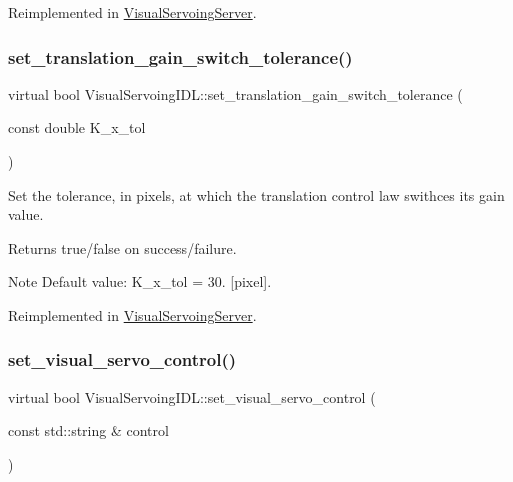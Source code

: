 Reimplemented in \hyperlink{classVisualServoingServer_a66324b38d90efb1e68cdfff9fd969487}{Visual\+Servoing\+Server}.

\mbox{\label{classVisualServoingIDL_ad7800969fdb9a88cce5e59552fca8b1f}} 
\subsubsection{\texorpdfstring{set\+\_\+translation\+\_\+gain\+\_\+switch\+\_\+tolerance()}{set\_translation\_gain\_switch\_tolerance()}}
{\footnotesize\ttfamily virtual bool Visual\+Servoing\+I\+D\+L\+::set\+\_\+translation\+\_\+gain\+\_\+switch\+\_\+tolerance (\begin{DoxyParamCaption}\item[{const double}]{K\+\_\+x\+\_\+tol }\end{DoxyParamCaption})\hspace{0.3cm}{\ttfamily [virtual]}}



Set the tolerance, in pixels, at which the translation control law swithces its gain value. 

\begin{DoxyReturn}{Returns}
true/false on success/failure. 
\end{DoxyReturn}
\begin{DoxyNote}{Note}
Default value\+: K\+\_\+x\+\_\+tol = 30. \mbox{[}pixel\mbox{]}. 
\end{DoxyNote}


Reimplemented in \hyperlink{classVisualServoingServer_a280690a55037cfaaacd39ca95470a507}{Visual\+Servoing\+Server}.

\mbox{\label{classVisualServoingIDL_a3db9d27ad8982f561f44a644897c8a9e}} 
\subsubsection{\texorpdfstring{set\+\_\+visual\+\_\+servo\+\_\+control()}{set\_visual\_servo\_control()}}
{\footnotesize\ttfamily virtual bool Visual\+Servoing\+I\+D\+L\+::set\+\_\+visual\+\_\+servo\+\_\+control (\begin{DoxyParamCaption}\item[{const std\+::string \&}]{control }\end{DoxyParamCaption})\hspace{0.3cm}{\ttfamily [virtual]}}



